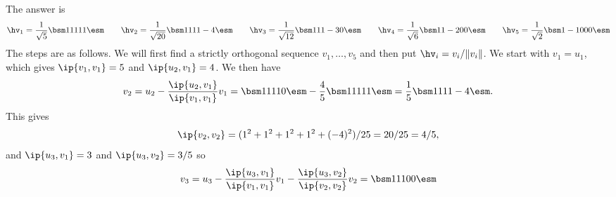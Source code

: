\begin{solution}
 The  answer is 
 \[
  \hv_1 = \frac{1}{\sqrt{5}}\bsm 1\\ 1\\ 1\\ 1\\ 1\esm \hspace{2em}
  \hv_2 = \frac{1}{\sqrt{20}}\bsm 1\\ 1\\ 1\\ 1\\ -4\esm \hspace{2em}
  \hv_3 = \frac{1}{\sqrt{12}}\bsm 1\\ 1\\ 1\\ -3 \\ 0\esm \hspace{2em}
  \hv_4 = \frac{1}{\sqrt{6}}\bsm 1\\ 1\\ -2 \\ 0 \\ 0 \esm \hspace{2em}
  \hv_5 = \frac{1}{\sqrt{2}}\bsm 1\\ -1\\ 0\\ 0\\ 0\esm
 \]
 The steps are as follows.  We will first find a strictly
 orthogonal sequence $v_1,\dotsc,v_5$ and then put
 $\hv_i=v_i/\|v_i\|$.  We start with $v_1=u_1$, which gives
 $\ip{v_1,v_1}=5$ and $\ip{u_2,v_1}=4$.  We then have
 \[ v_2 = u_2 - \frac{\ip{u_2,v_1}}{\ip{v_1,v_1}}v_1 =
     \bsm 1\\1\\1\\1\\0 \esm -
     \frac{4}{5}\bsm 1\\1\\1\\1\\1 \esm =
     \frac{1}{5} \bsm 1\\1\\1\\1\\-4 \esm.
 \]
 This gives 
 \[ \ip{v_2,v_2}=(1^2+1^2+1^2+1^2+(-4)^2)/25 = 20/25 = 4/5,
 \]
 and $\ip{u_3,v_1}=3$ and $\ip{u_3,v_2}=3/5$ so
 \[ v_3 = u_3 - \frac{\ip{u_3,v_1}}{\ip{v_1,v_1}}v_1
              - \frac{\ip{u_3,v_2}}{\ip{v_2,v_2}}v_2
    = \bsm 1\\ 1\\ 1\\ 0\\ 0\esm 
\]
\end{solution}
